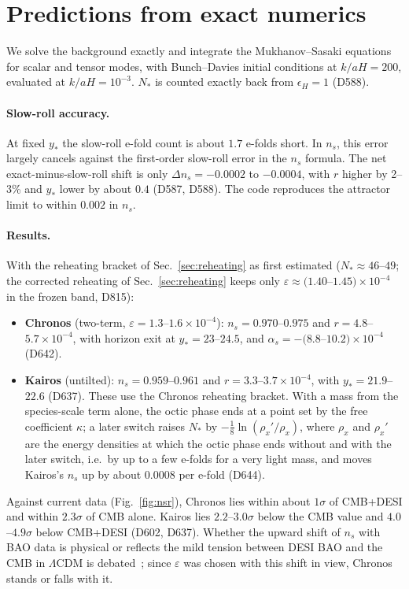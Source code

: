 \documentclass[aps,prd,twocolumn,superscriptaddress,nofootinbib,floatfix]{revtex4-2}
\begin{document}
\section{Predictions from exact numerics}\label{sec:predictions}
We solve the background exactly and integrate the Mukhanov--Sasaki equations for scalar and tensor modes, with Bunch--Davies initial conditions at $k/aH = 200$, evaluated at $k/aH = 10^{-3}$. $N_*$ is counted exactly back from $\epsilon_H = 1$ (D588).

\paragraph{Slow-roll accuracy.} At fixed $y_*$ the slow-roll e-fold count is about $1.7$ e-folds short. In $n_s$, this error largely cancels against the first-order slow-roll error in the $n_s$ formula. The net exact-minus-slow-roll shift is only $\Delta n_s = -0.0002$ to $-0.0004$, with $r$ higher by 2--3\% and $y_*$ lower by about $0.4$ (D587, D588). The code reproduces the attractor limit to within $0.002$ in $n_s$.

\paragraph{Results.} With the reheating bracket of Sec.~\ref{sec:reheating} as first estimated ($N_* \approx 46$--$49$; the corrected reheating of Sec.~\ref{sec:reheating} keeps only $\varepsilon\approx(1.40$--$1.45)\times10^{-4}$ in the frozen band, D815):
\begin{itemize}
\item \textbf{Chronos} (two-term, $\varepsilon = 1.3$--$1.6\times10^{-4}$): $n_s = 0.970$--$0.975$ and $r = 4.8$--$5.7\times10^{-4}$, with horizon exit at $y_* = 23$--$24.5$, and $\alpha_s=-(8.8$--$10.2)\times10^{-4}$ (D642).
\item \textbf{Kairos} (untilted): $n_s = 0.959$--$0.961$ and $r = 3.3$--$3.7\times10^{-4}$, with $y_* = 21.9$--$22.6$ (D637). These use the Chronos reheating bracket. With a mass from the species-scale term alone, the octic phase ends at a point set by the free coefficient $\kappa$; a later switch raises $N_*$ by $-\tfrac18\ln(\rho_x'/\rho_x)$, where $\rho_x$ and $\rho_x'$ are the energy densities at which the octic phase ends without and with the later switch, i.e.\ by up to a few e-folds for a very light mass, and moves Kairos's $n_s$ up by about $0.0008$ per e-fold (D644).
\end{itemize}
Against current data (Fig.~\ref{fig:nsr}), Chronos lies within about $1\sigma$ of CMB+DESI and within $2.3\sigma$ of CMB alone. Kairos lies $2.2$--$3.0\sigma$ below the CMB value and $4.0$--$4.9\sigma$ below CMB+DESI (D602, D637). Whether the upward shift of $n_s$ with BAO data is physical or reflects the mild tension between DESI BAO and the CMB in $\Lambda$CDM is debated~\cite{arXiv_2503_14738}; since $\varepsilon$ was chosen with this shift in view, Chronos stands or falls with it.
\end{document}
